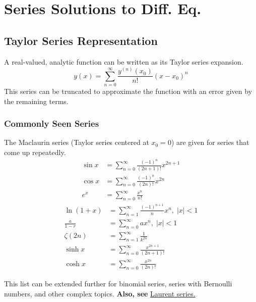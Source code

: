 \chapter{Series Solutions to Diff. Eq.}



\section{Taylor Series Representation}
A real-valued, analytic function can be written as its Taylor series expansion.
\begin{equation*}
    y(x) = \sum_{n=0}^\infty \frac{y^{(n)}(x_0)}{n!} (x-x_0)^n
\end{equation*}
This series can be truncated to approximate the function with an error given by the remaining terms.


\subsection{Commonly Seen Series}
The Maclaurin series (Taylor series centered at $x_0 = 0$) are given for series that come up repeatedly.
\begin{align*}
    \sin x & = \sum_{n=0}^\infty \frac{(-1)^n}{(2n+1)!} x^{2n+1} \\
    \cos x & = \sum_{n=0}^\infty \frac{(-1)^n}{(2n)!} x^{2n} \\
    e^x & = \sum_{n=0}^\infty \frac{x^n}{n!} 
\end{align*}
\begin{align*}
    \ln (1+x) & = \sum_{n=1}^\infty \frac{(-1)^{n+1}}{n} x^{n}, \; |x|<1 \\
    \frac{a}{1-r}  & = \sum_{n=0}^\infty a x^{n}, \; |x|<1 \\
    \zeta (2n) & = \sum_{n=1}^\infty \frac{1}{k^{2n}} \\
    \sinh x & = \sum_{n=0}^\infty \frac{x^{2n+1}}{(2n+1)!}  \\
    \cosh x & = \sum_{n=0}^\infty \frac{ x^{2n}}{(2n)!} 
\end{align*}

This list can be extended further for binomial series, series with Bernoulli numbers, and other complex topics. \textbf{Also, see} \href{https://en.wikipedia.org/wiki/Laurent_series}{Laurent series.}


